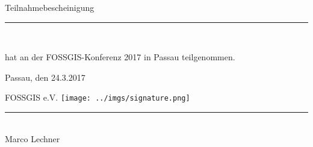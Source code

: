 \documentclass[a4paper, 12pt]{letter}
\begin{document}
{  \begin{center}

    \vspace*{4mm}
    \Huge Teilnahmebescheinigung
    \noindent\rule{0.9\textwidth}{1pt}\\
    
    \vspace*{14mm}
        
    \Huge
    \person
    
    \vspace*{8mm}
    
    \large
    
    hat an der FOSSGIS-Konferenz 2017 in Passau teilgenommen.\\
    
    \vspace*{15mm}
    
  \end{center}


  \vspace*{18mm}

  \large
  \hskip 1cm Passau, den 24.3.2017
  
  \vspace*{12mm}
  
  \hskip 1cm FOSSGIS e.V. \hskip 1cm \texttt{[image: ../imgs/signature.png]} \hskip -6cm  \rule{7cm}{0.5pt}\\
  
  \normalsize
  \vskip -10mm \hskip 55mm Marco Lechner
  
  \newpage
} 
\end{document}
